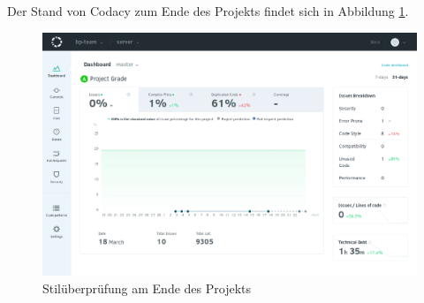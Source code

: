 \documentclass[accentcolor=tud9c,12pt,paper=a4]{tudreport}
\begin{document}
	Der Stand von Codacy zum Ende des Projekts findet sich in Abbildung \ref{codacy_png}.
	\begin{figure}[t]
		\centering
	\includegraphics[width=.9\textwidth]{codacy}
		\caption{Stilüberprüfung am Ende des Projekts}
		\label{codacy_png}
	\end{figure}
\end{document}
